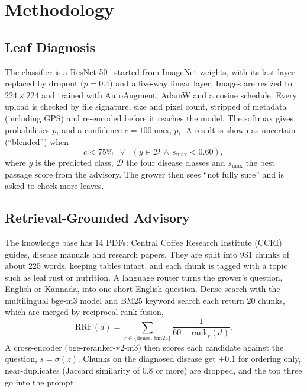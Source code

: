 \section{Methodology}
\subsection{Leaf Diagnosis}
The classifier is a ResNet-50~\cite{he2016resnet} started from ImageNet weights, with its last layer replaced by dropout
($p=0.4$) and a five-way linear layer. Images are resized to $224\times224$ and trained with AutoAugment, AdamW and a
cosine schedule. Every upload is checked by file signature, size and pixel count, stripped of metadata (including GPS)
and re-encoded before it reaches the model. The softmax gives probabilities $p_i$ and a confidence $c=100\max_i p_i$.
A result is shown as uncertain (``blended'') when
\begin{equation}
c < 75\% \;\;\lor\;\; (y \in \mathcal{D} \,\land\, s_{\max} < 0.60),
\end{equation}
where $y$ is the predicted class, $\mathcal{D}$ the four disease classes and $s_{\max}$ the best passage score from the
advisory. The grower then sees ``not fully sure'' and is asked to
check more leaves.

\subsection{Retrieval-Grounded Advisory}
The knowledge base has 14 PDFs: Central Coffee Research Institute (CCRI) guides, disease manuals and research papers.
They are split into 931 chunks of about 225 words, keeping tables intact, and each chunk is tagged with a topic such as
leaf rust or nutrition. A language router turns the grower's question, English or Kannada, into one short English
question. Dense search with the multilingual bge-m3 model and BM25 keyword search each return 20 chunks, which are
merged by reciprocal rank fusion,
\begin{equation}
\mathrm{RRF}(d)=\sum_{r\in\{\mathrm{dense},\,\mathrm{bm25}\}}\frac{1}{60+\mathrm{rank}_r(d)} .
\end{equation}
A cross-encoder (bge-reranker-v2-m3) then scores each candidate against the question, $s=\sigma(z)$. Chunks on the
diagnosed disease get $+0.1$ for ordering only, near-duplicates (Jaccard similarity of 0.8 or more) are dropped, and the
top three go into the prompt.

